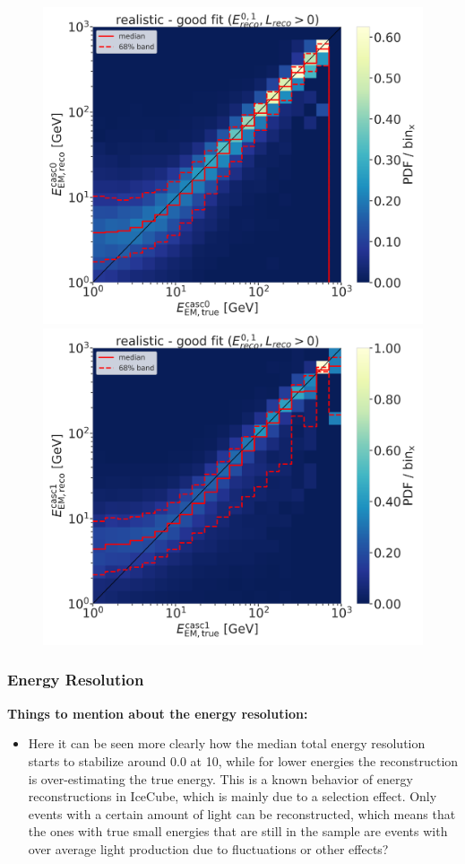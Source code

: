 \begin{figure}[h]
	\centering
    \includegraphics[width=0.49\linewidth]{figures/model_independent_simulation/results/realistic/2d_hists/194603_casc0_reco_energy_vs_casc0_true_energy_goodfit_step_contours.png}
    \includegraphics[width=0.49\linewidth]{figures/model_independent_simulation/results/realistic/2d_hists/194603_casc1_reco_energy_vs_casc1_true_energy_goodfit_step_contours.png}
    \caption[]{}
\end{figure}


\subsubsection{Energy Resolution}

\textbf{Things to mention about the energy resolution:}
\begin{itemize}
    \item Here it can be seen more clearly how the median total energy resolution starts to stabilize around 0.0 at \SI{10}{\gev}, while for lower energies the reconstruction is over-estimating the true energy. This is a known behavior of energy reconstructions in IceCube, which is mainly due to a selection effect. Only events with a certain amount of light can be reconstructed, which means that the ones with true small energies that are still in the sample are events with over average light production due to fluctuations or other effects?
\end{itemize}

